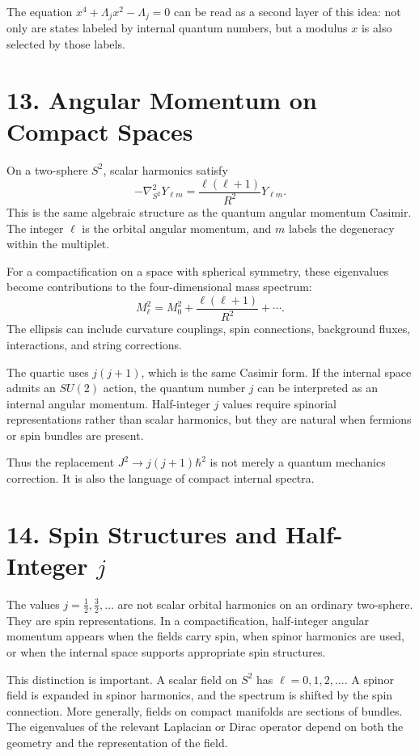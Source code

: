 \documentclass[11pt]{article}
\newcommand{\Lspin}{\Lambda_j}
\newcommand{\hb}{\hbar}
\begin{document}
The equation \(x^4+\Lspin x^2-\Lspin=0\) can be read as a second layer of this idea: not only are states labeled by internal quantum numbers, but a modulus \(x\) is also selected by those labels.


\section*{13. Angular Momentum on Compact Spaces}

On a two-sphere \(S^2\), scalar harmonics satisfy
\[
        -\nabla^2_{S^2}Y_{\ell m}
        =
        \frac{\ell(\ell+1)}{R^2}Y_{\ell m}.
\]
This is the same algebraic structure as the quantum angular momentum Casimir. The integer \(\ell\) is the orbital angular momentum, and \(m\) labels the degeneracy within the multiplet.

For a compactification on a space with spherical symmetry, these eigenvalues become contributions to the four-dimensional mass spectrum:
\[
        M_{\ell}^2=M_0^2+\frac{\ell(\ell+1)}{R^2}+\cdots .
\]
The ellipsis can include curvature couplings, spin connections, background fluxes, interactions, and string corrections.

The quartic uses \(j(j+1)\), which is the same Casimir form. If the internal space admits an \(SU(2)\) action, the quantum number \(j\) can be interpreted as an internal angular momentum. Half-integer \(j\) values require spinorial representations rather than scalar harmonics, but they are natural when fermions or spin bundles are present.

Thus the replacement \(J^2\to j(j+1)\hb^2\) is not merely a quantum mechanics correction. It is also the language of compact internal spectra.


\section*{14. Spin Structures and Half-Integer \(j\)}

The values \(j=\frac12,\frac32,\ldots\) are not scalar orbital harmonics on an ordinary two-sphere. They are spin representations. In a compactification, half-integer angular momentum appears when the fields carry spin, when spinor harmonics are used, or when the internal space supports appropriate spin structures.

This distinction is important. A scalar field on \(S^2\) has \(\ell=0,1,2,\ldots\). A spinor field is expanded in spinor harmonics, and the spectrum is shifted by the spin connection. More generally, fields on compact manifolds are sections of bundles. The eigenvalues of the relevant Laplacian or Dirac operator depend on both the geometry and the representation of the field.
\end{document}
